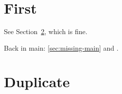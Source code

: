 \documentclass{article}
\begin{document}
\section{First}\label{sec:first}
See Section~\ref{sec:first}, which is fine.



Back in main: \ref{sec:missing-main} and \cite{nobody}.

\section{Duplicate}\label{sec:first}
\end{document}
